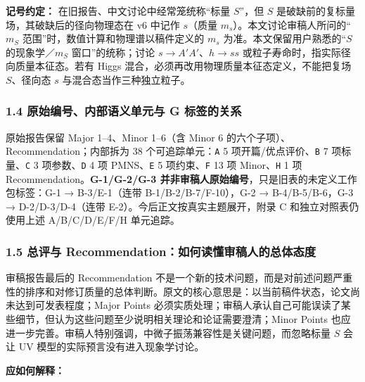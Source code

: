 \documentclass[
  chinese,
  UTF8]{ctexart}
\begin{document}
\textbf{记号约定：} 在旧报告、中文讨论中经常笼统称``标量 \(S\)''，但
\(S\) 是破缺前的复标量场，其破缺后的径向物理态在 v6 中记作 \(s\)（质量
\(m_s\)）。本文讨论审稿人所问的``\(m_S\)
范围''时，数值计算和物理谱以稿件定义的 \(m_s\)
为准。本文保留用户熟悉的``\(S\) 的现象学／\(m_S\) 窗口''的统称；讨论
\(s\to A\prime A\prime\)、\(h\to ss\)
或粒子寿命时，指实际径向质量本征态。若有 Higgs
混合，必须再改用物理质量本征态定义，不能把复场 \(S\)、径向态 \(s\)
与混合态当作三种独立粒子。

\subsubsection{1.4 原始编号、内部语义单元与 G
标签的关系}\label{ux539fux59cbux7f16ux53f7ux5185ux90e8ux8bedux4e49ux5355ux5143ux4e0e-g-ux6807ux7b7eux7684ux5173ux7cfb}

原始报告保留 Major 1--4、Minor 1--6（含 Minor 6
的六个子项）、Recommendation；内部拆为 38 个可追踪单元：\texttt{A} 5
项开篇/优点评价、\texttt{B} 7 项标量、\texttt{C} 3 项参数、\texttt{D} 4
项 PMNS、\texttt{E} 5 项约束、\texttt{F} 13 项 Minor、\texttt{H} 1 项
Recommendation。\textbf{G-1/G-2/G-3
并非审稿人原始编号}，只是旧表的未定义工作包标签：G-1 → B-3/E-1（连带
B-1/B-2/B-7/F-10），G-2 → B-4/B-5/B-6，G-3 → D-2/D-3/D-4（连带
E-2）。今后正文按真实主题展开，附录 C 和独立对照表仍使用上述
A/B/C/D/E/F/H 单元追踪。

\subsubsection{1.5 总评与
Recommendation：如何读懂审稿人的总体态度}\label{ux603bux8bc4ux4e0e-recommendationux5982ux4f55ux8bfbux61c2ux5ba1ux7a3fux4ebaux7684ux603bux4f53ux6001ux5ea6}

审稿报告最后的 Recommendation
不是一个新的技术问题，而是对前述问题严重性的排序和对修订质量的总体判断。原文的核心意思是：以当前稿件状态，论文尚未达到可发表程度；Major
Points
必须实质处理；审稿人承认自己可能误读了某些细节，但认为这些问题至少说明相关理论和论证需要澄清；Minor
Points
也应进一步完善。审稿人特别强调，中微子振荡兼容性是关键问题，而忽略标量
\(S\) 会让 UV 模型的实际预言没有进入现象学讨论。

\textbf{应如何解释：}
\end{document}
